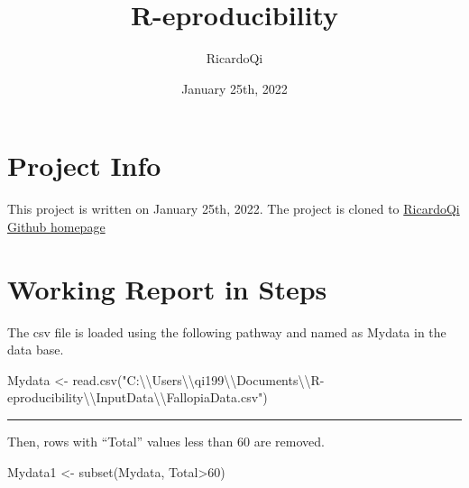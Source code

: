 \documentclass[
]{article}
\title{R-eproducibility}
\author{RicardoQi}
\date{January 25th, 2022}
\newenvironment{Shaded}{\begin{snugshade}}{\end{snugshade}}
\newcommand{\DecValTok}[1]{\textcolor[rgb]{0.00,0.00,0.81}{#1}}
\newcommand{\FunctionTok}[1]{\textcolor[rgb]{0.00,0.00,0.00}{#1}}
\newcommand{\NormalTok}[1]{#1}
\newcommand{\OtherTok}[1]{\textcolor[rgb]{0.56,0.35,0.01}{#1}}
\newcommand{\SpecialCharTok}[1]{\textcolor[rgb]{0.00,0.00,0.00}{#1}}
\newcommand{\StringTok}[1]{\textcolor[rgb]{0.31,0.60,0.02}{#1}}
\begin{document}
\maketitle

\hypertarget{project-info}{%
\section{Project Info}\label{project-info}}

This project is written on January 25th, 2022. The project is cloned to
\href{https://github.com/RicardoQi/R-eproducibility.git}{RicardoQi
Github homepage}

\hypertarget{working-report-in-steps}{%
\section{Working Report in Steps}\label{working-report-in-steps}}

The csv file is loaded using the following pathway and named as Mydata
in the data base.

\begin{Shaded}
\begin{Highlighting}[]
\NormalTok{Mydata }\OtherTok{\textless{}{-}} \FunctionTok{read.csv}\NormalTok{(}\StringTok{"C:}\SpecialCharTok{\textbackslash{}\textbackslash{}}\StringTok{Users}\SpecialCharTok{\textbackslash{}\textbackslash{}}\StringTok{qi199}\SpecialCharTok{\textbackslash{}\textbackslash{}}\StringTok{Documents}\SpecialCharTok{\textbackslash{}\textbackslash{}}\StringTok{R{-}eproducibility}\SpecialCharTok{\textbackslash{}\textbackslash{}}\StringTok{InputData}\SpecialCharTok{\textbackslash{}\textbackslash{}}\StringTok{FallopiaData.csv"}\NormalTok{)}
\end{Highlighting}
\end{Shaded}

\begin{center}\rule{0.5\linewidth}{0.5pt}\end{center}

Then, rows with ``Total'' values less than 60 are removed.

\begin{Shaded}
\begin{Highlighting}[]
\NormalTok{Mydata1 }\OtherTok{\textless{}{-}} \FunctionTok{subset}\NormalTok{(Mydata, Total}\SpecialCharTok{\textgreater{}}\DecValTok{60}\NormalTok{)}
\end{Highlighting}
\end{Shaded}
\end{document}
